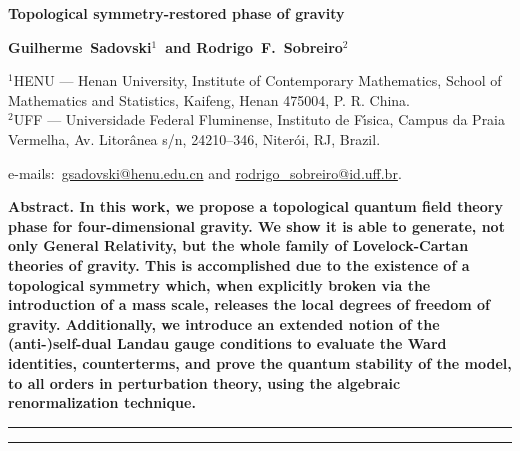 \documentclass[main.tex]{subfiles}
\begin{document}
\thispagestyle{empty}
{
\noindent
\Large
\bfseries
Topological symmetry-restored phase of gravity
\bigskip
\bigskip
}

{
\noindent
\bfseries
Guilherme~Sadovski${}^{1}${\normalfont~and}
Rodrigo~F.~Sobreiro${}^{2}$
\bigskip
}

{
\noindent
\footnotesize
${}^{1}$HENU --- Henan University, Institute of Contemporary Mathematics, School of Mathematics and Statistics, Kaifeng, Henan 475004, P. R. China. \\
${}^{2}$UFF --- Universidade Federal Fluminense, Instituto de F{\'{\i}}sica, Campus da Praia Vermelha, Av. Litor{\^{a}}nea s/n, 24210--346, Niter{\'{o}}i, RJ, Brazil.
\bigskip
\bigskip
}

{
\noindent
\footnotesize
\rmfamily
e-mails:~\href{mailto:gsadovski@henu.edu.cn}{gsadovski@henu.edu.cn}
and
\href{mailto:rodrigo\_sobreiro@id.uff.br}{rodrigo\_sobreiro@id.uff.br}.
\bigskip
}

{
\noindent
\bfseries
Abstract.\normalfont{} In this work, we propose a topological quantum field theory phase for four-dimensional gravity. We show it is able to generate, not only General Relativity, but the whole family of Lovelock-Cartan theories of gravity. This is accomplished due to the existence of a topological symmetry which, when explicitly broken via the introduction of a mass scale, releases the local degrees of freedom of gravity. Additionally, we introduce an extended notion of the (anti-){}self-dual Landau gauge conditions to evaluate the Ward identities, counterterms, and prove the quantum stability of the model, to all orders in perturbation theory, using the algebraic renormalization technique.
\bigskip
}

{
\noindent
\rule{\textwidth}{1pt}
\vspace{-4.5ex}
\tableofcontents
\noindent
\rule{\linewidth}{1pt}
}
\end{document}

